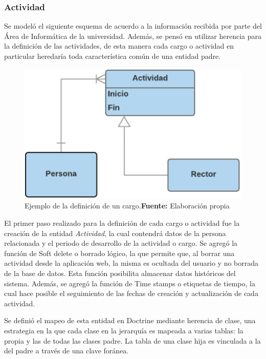 \subsubsection{Actividad}%
\label{ssub:actividad}
Se modeló el siguiente esquema de acuerdo a la información recibida por parte del Área de Informática de la universidad\@.
Además, se pensó en utilizar herencia para la definición de las actividades, de esta manera cada cargo o actividad en particular
heredaría toda característica común de una entidad padre.

\begin{figure}[H]
    \centering
    \includegraphics[scale=1]{image/actividad-modelo.png}
    \captionsetup{justification=centering}
    \caption[Ejemplo de la definición de un cargo]{Ejemplo de la definición de un cargo.\newline \textbf{Fuente:} Elaboración propia}%
    \label{fig:image/actividad-modelo}
\end{figure}
El primer paso realizado para la definición de cada cargo o actividad fue la creación de la entidad \textit{Actividad}, la cual contendrá
datos de la persona relacionada y el periodo de desarrollo de la actividad o cargo\@.
Se agregó la función de Soft delete o borrado lógico, la que permite que, al borrar una actividad desde la aplicación web,
la misma es ocultada del usuario y no borrada de la base de datos\@. Esta función posibilita almacenar datos históricos del sistema\@.
Además, se agregó la función de Time stamps o etiquetas de tiempo, la cual hace posible el seguimiento de las fechas de creación
y actualización de cada actividad.


Se definió el mapeo de esta entidad en Doctrine mediante herencia de clase, una estrategia en la que cada clase en la jerarquía es mapeada a varias tablas:
la propia y las de todas las clases padre. La tabla de una clase hija es vinculada a la del padre a través de una clave foránea.

